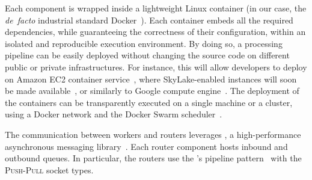 

Each component is wrapped inside a lightweight Linux container (in our case, the \emph{de~facto} industrial standard Docker~\cite{docker}).
Each container embeds all the required dependencies, while guaranteeing the correctness of their configuration, within an isolated and reproducible execution environment.
By doing so, a \SYS{} processing pipeline can be easily deployed without changing the source code on different public or private infrastructures.
For instance, this will allow developers to deploy \SYS{} on Amazon EC2 container service~\cite{awsec2container}, where SkyLake-enabled instances will soon be made available~\cite{amazonskylake}, or similarly to Google compute engine~\cite{gceskylake}.
The deployment of the containers can be transparently executed on a single machine or a cluster, using a Docker network and the Docker Swarm scheduler~\cite{docker:swarm_2016}.

The communication between workers and routers leverages \zmq{}, a high-performance asynchronous messaging library~\cite{zero_mq}.
Each router component hosts inbound and outbound queues.
In particular, the routers use the \zmq's pipeline pattern~\cite{zero_mq:pipeline} with the \textsc{Push}-\textsc{Pull} socket types. 


